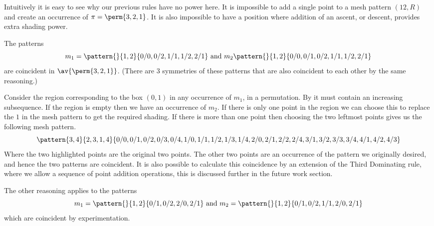 Intuitively it is easy to see why our previous rules have no
power here. It is impossible to add a single point to a mesh pattern \((12, R)\) and
create an occurrence of \(\pi = \perm{3,2,1}\). It is also impossible to have
a position where addition of an ascent, or descent, provides extra
shading power.

The patterns
\begin{equation*}
    m_1 = \pattern{}{1,2}{0/0, 0/2, 1/1, 1/2, 2/1} \text { and } m_2 \pattern{}{1,2}{0/0, 0/1, 0/2, 1/1, 1/2, 2/1}
\end{equation*}
are coincident in \(\av{\perm{3,2,1}}\). (There are 3 symmetries of these
patterns that are also coincident to each other by the same reasoning.)

Consider the region corresponding to the box \((0,1)\) in any occurrence of \(m_1\),
in a permutation. By  it must contain an increasing subsequence.
If the region is empty then we have an occurrence of \(m_2\).
If there is only one point in the region we can choose this to replace the \(1\) in
the mesh pattern to get the required shading. If there is more than one point then
choosing the two leftmost points gives us the following mesh pattern.
\begin{equation*}
    \pattern{3,4}{2,3,1,4}{0/0, 0/1, 0/2, 0/3, 0/4,
                            1/0, 1/1, 1/2, 1/3, 1/4,
                            2/0, 2/1,2/2, 2/4,
                            3/1, 3/2, 3/3, 3/4,
                            4/1, 4/2, 4/3}
\end{equation*}
Where the two highlighted points are the original two points.
The other two points are an occurrence of the pattern
we originally desired, and hence the two patterns are coincident.
It is also possible to calculate this coincidence by an extension of the Third
Dominating rule, where we allow a sequence of point addition operations, this
is discussed further in the future work section.

The other reasoning applies to the patterns
\begin{equation*}
    m_1 = \pattern{}{1,2}{0/1,0/2,2/0,2/1} \text{ and } m_2 = \pattern{}{1,2}{0/1,0/2,1/1,2/0,2/1}
\end{equation*}
which are coincident by experimentation.


